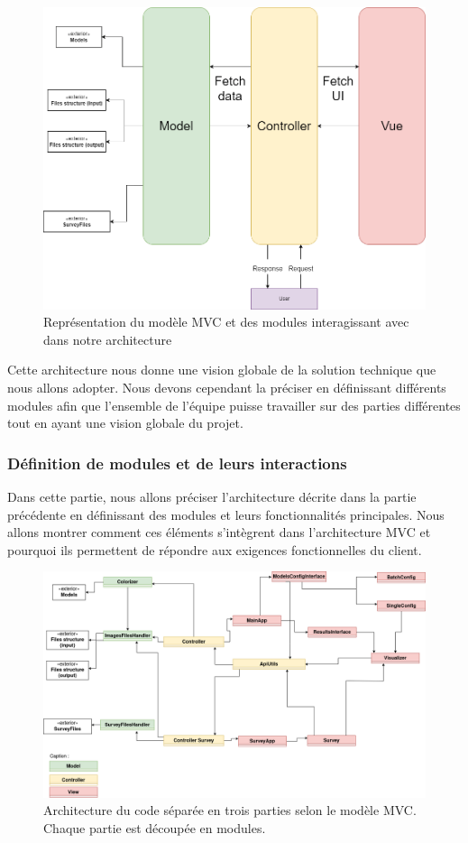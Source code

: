 \documentclass{article}
\begin{document}
\begin{figure}[htp]
    \centering
    \includegraphics[width=14cm]{code-architecture-mvc.png}
    \caption{Représentation du modèle MVC et des modules interagissant avec dans notre architecture}
    \label{fig:mvc}
\end{figure}

Cette architecture nous donne une vision globale de la solution technique que nous allons adopter.
Nous devons cependant la préciser en définissant différents modules afin que l'ensemble de l'équipe puisse travailler sur des parties différentes tout en ayant une vision globale du projet.

\subsubsection{Définition de modules et de leurs interactions}\label{sec:archi-detaillee}
Dans cette partie, nous allons préciser l'architecture décrite dans la partie précédente en définissant des modules et leurs fonctionnalités principales. 
Nous allons montrer comment ces éléments s'intègrent dans l'architecture MVC et pourquoi ils permettent de répondre aux exigences fonctionnelles du client.

\begin{figure}[!h]
    \centering
    \includegraphics[width=16cm]{code-architecture.png}
    \caption{Architecture du code séparée en trois parties selon le modèle MVC. Chaque partie est découpée en modules.}
    \label{fig:architecture}
\end{figure}
\end{document}
